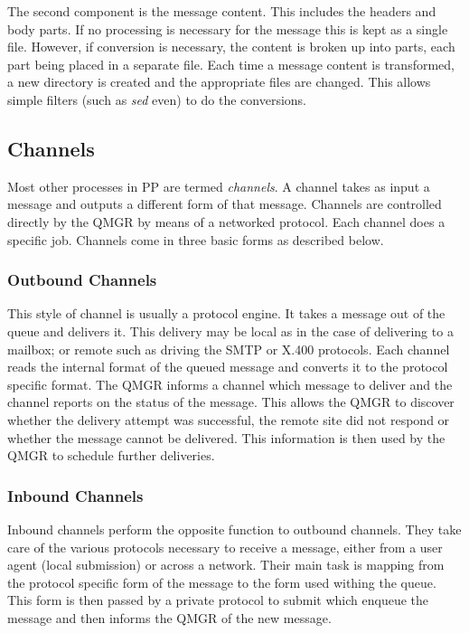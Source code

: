 The second component is the message content. This includes the headers
and body parts. If no processing is necessary for the message this is
kept as a single file. However, if conversion is necessary, the
content is broken up into parts, each part being placed in a separate
file. Each time a message content is transformed, a new directory is
created and the appropriate files are changed. This allows simple
filters (such as {\em sed} even) to do the conversions.


\subsection{Channels}

Most other processes in PP are termed {\em channels}. A channel takes
as input a message and outputs a different form of that message.
Channels are controlled directly by the QMGR by means of a networked
protocol. Each channel does a specific job. Channels come in three
basic forms as described below.

\subsubsection{Outbound Channels}
This style of channel is usually a protocol engine. It takes a message
out of the queue and delivers it. This delivery may be local as in the
case of delivering to a mailbox; or remote such as driving the
SMTP\cite{SMTP} or X.400 protocols. Each channel reads the internal
format of the queued message and converts it to the protocol specific
format. The QMGR informs a channel which message to deliver and the
channel reports on the status of the message. This allows the QMGR to
discover whether the delivery attempt was successful, the remote site
did not respond or whether the message cannot be delivered. This
information is then used by the QMGR to schedule further deliveries.

\subsubsection{Inbound Channels}
Inbound channels perform the opposite function to outbound channels.
They take care of the various protocols necessary to receive a
message, either from a user agent (local submission) or across a
network. Their main task is mapping from the protocol specific form of
the message to the form used withing the queue. This form is then
passed by a private protocol to submit which enqueue the message and
then informs the QMGR of the new message.

